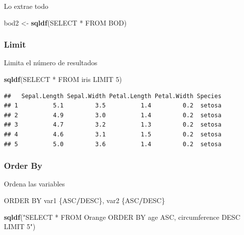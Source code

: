 \documentclass[
]{book}
\newenvironment{Shaded}{\begin{snugshade}}{\end{snugshade}}
\newcommand{\FunctionTok}[1]{\textcolor[rgb]{0.13,0.29,0.53}{\textbf{#1}}}
\newcommand{\NormalTok}[1]{#1}
\newcommand{\OtherTok}[1]{\textcolor[rgb]{0.56,0.35,0.01}{#1}}
\newcommand{\SpecialCharTok}[1]{\textcolor[rgb]{0.81,0.36,0.00}{\textbf{#1}}}
\newcommand{\StringTok}[1]{\textcolor[rgb]{0.31,0.60,0.02}{#1}}
\begin{document}
Lo extrae todo

\begin{Shaded}
\begin{Highlighting}[]
\NormalTok{bod2 }\OtherTok{\textless{}{-}} \FunctionTok{sqldf}\NormalTok{(}\StringTok{\textquotesingle{}SELECT * FROM BOD\textquotesingle{}}\NormalTok{)}
\end{Highlighting}
\end{Shaded}

\subsubsection{Limit}\label{limit}

Limita el número de resultados

\begin{Shaded}
\begin{Highlighting}[]
\FunctionTok{sqldf}\NormalTok{(}\StringTok{\textquotesingle{}SELECT * FROM iris LIMIT 5\textquotesingle{}}\NormalTok{)}
\end{Highlighting}
\end{Shaded}

\begin{verbatim}
##   Sepal.Length Sepal.Width Petal.Length Petal.Width Species
## 1          5.1         3.5          1.4         0.2  setosa
## 2          4.9         3.0          1.4         0.2  setosa
## 3          4.7         3.2          1.3         0.2  setosa
## 4          4.6         3.1          1.5         0.2  setosa
## 5          5.0         3.6          1.4         0.2  setosa
\end{verbatim}

\subsubsection{Order By}\label{order-by}

Ordena las variables

\begin{Shaded}
\begin{Highlighting}[]
\NormalTok{ORDER BY var1 \{ASC}\SpecialCharTok{/}\NormalTok{DESC\}, var2 \{ASC}\SpecialCharTok{/}\NormalTok{DESC\}}
\end{Highlighting}
\end{Shaded}

\begin{Shaded}
\begin{Highlighting}[]
\FunctionTok{sqldf}\NormalTok{(}\StringTok{"SELECT * FROM Orange ORDER BY age ASC, circumference DESC LIMIT 5"}\NormalTok{)}
\end{Highlighting}
\end{Shaded}
\end{document}
